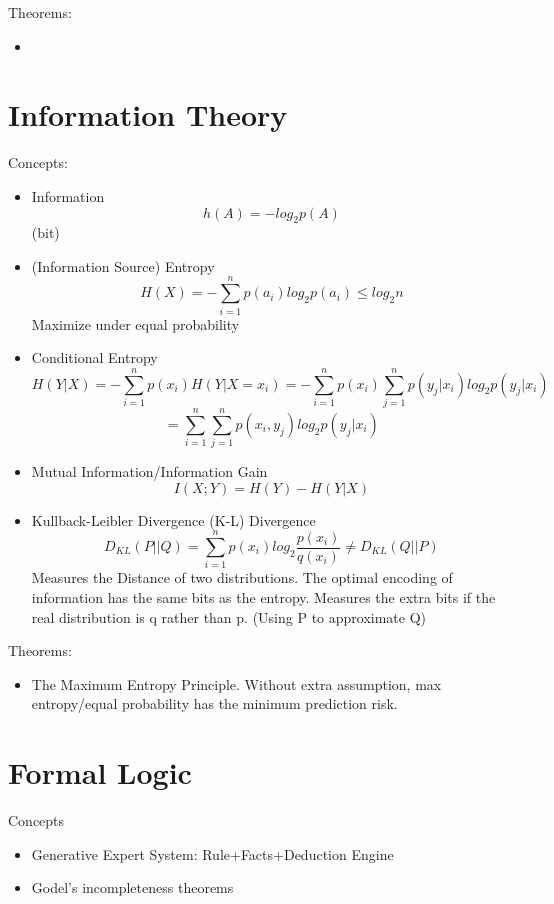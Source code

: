 \documentclass[11pt, openany]{book}              %
\begin{document}
Theorems:

\begin{itemize}
	\item
\end{itemize}

\section{Information Theory}

Concepts:

\begin{itemize}
    \item Information $$h(A) = -log_2 p(A)$$ (bit)
    \item (Information Source) Entropy $$ H(X) = -\sum_{i=1}^n p(a_i)log_2p(a_i) \leq log_2 n$$ Maximize under equal probability
    \item Conditional Entropy $$H(Y|X)  = -\sum_{i=1}^n p(x_i)H(Y|X=x_i)= -\sum_{i=1}^n p(x_i)\sum_{j=1}^n p(y_j|x_i) log_2p(y_j|x_i) $$ $$ = \sum_{i=1}^n \sum_{j=1}^n p(x_i,y_j) log_2p(y_j|x_i) $$
    \item Mutual Information/Information Gain $$I(X;Y) = H(Y) - H(Y|X)$$
    \item Kullback-Leibler Divergence (K-L) Divergence $$D_{KL}(P||Q) = \sum_{i=1}^n p(x_i) log_2\frac{p(x_i)}{q(x_i)} \neq D_{KL}(Q||P)$$
    	Measures the Distance of two distributions. The optimal encoding of information has the same bits as the entropy. Measures the extra bits if the real distribution is q rather than p. (Using P to approximate Q)
\end{itemize}


Theorems:

\begin{itemize}
    \item The Maximum Entropy Principle. Without extra assumption, max entropy/equal probability has the minimum prediction risk. 
\end{itemize}

\section{Formal Logic}

Concepts
\begin{itemize}
    \item Generative Expert System: Rule+Facts+Deduction Engine 
    \item Godel's incompleteness theorems
\end{itemize}
\end{document}
